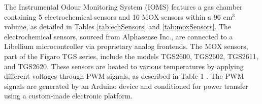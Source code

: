 \documentclass[final,3p,times,twocolumn]{elsarticle}
\begin{document}


The Instrumental Odour Monitoring System (IOMS) features a gas chamber containing 5 electrochemical sensors and 16 MOX sensors within a 96 cm$^{3}$ volume, as detailed in Tables \ref{tab:echSensors} and \ref{tab:moxSensors}. The electrochemical sensors, sourced from Alphasense Inc., are connected to a Libellium microcontroller via proprietary analog frontends. The MOX sensors, part of the Figaro TGS series, include the models TGS2600, TGS2602, TGS2611, and TGS2620. These sensors are heated to various temperatures by applying different voltages through PWM signals, as described in Table 1 \cite{Fonollosa2013,Burgués2018}. The PWM signals are generated by an Arduino device and conditioned for power transfer using a custom-made electronic platform.

\begin{table}[ht]
    \centering
    \caption{Specifications of electrochemical, NDIR and Flow sensor}
    \label{tab:echSensors}
\end{table}
\end{document}
